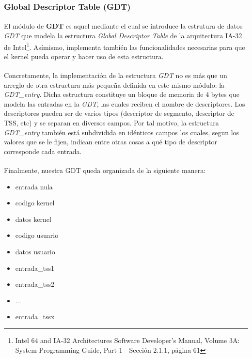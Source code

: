 \documentclass[11pt, a4paper]{article}
\begin{document}
\subsubsection{Global Descriptor Table (GDT)}
\paragraph{}
El módulo de \textbf{GDT} es aquel mediante el cual se introduce la estrutura de datos \textit{GDT} que modela la estructura \textit{Global Descriptor Table} de la arquitectura IA-32 de Intel\footnote{Intel 64 and IA-32 Architectures Software Developer’s Manual, Volume 3A: System Programming Guide, Part 1 - Sección 2.1.1, página 61}. Asímismo, implementa también las funcionalidades necesarias para que el kernel pueda operar y hacer uso de esta estructura.

\paragraph{}
Concretamente, la implementación de la estructura \textit{GDT} no es más que un arreglo de otra estructura más pequeña definida en este mismo módulo: la \textit{GDT\_entry}. Dicha estructura constituye un bloque de memoria de 4 bytes que modela las entradas en la \textit{GDT}, las cuales reciben el nombre de descriptores. Los descriptores pueden ser de varios tipos (descriptor de segmento, descriptor de TSS, etc) y se separan en diversos campos. Por tal motivo, la estructura \textit{GDT\_entry} también está subdividida en idénticos campos los cuales, segun los valores que se le fijen, indican entre otras cosas a qué tipo de descriptor corresponde cada entrada.

\paragraph{}
Finalmente, nuestra GDT queda organizada de la siguiente manera:


\begin{itemize}
	\item entrada nula
	\item codigo kernel
	\item datos kernel
	\item codigo usuario
	\item datos usuario
	\item entrada\_tss1
	\item entrada\_tss2
	\item ...	
	\item entrada\_tssx

\end{itemize}
\end{document}
